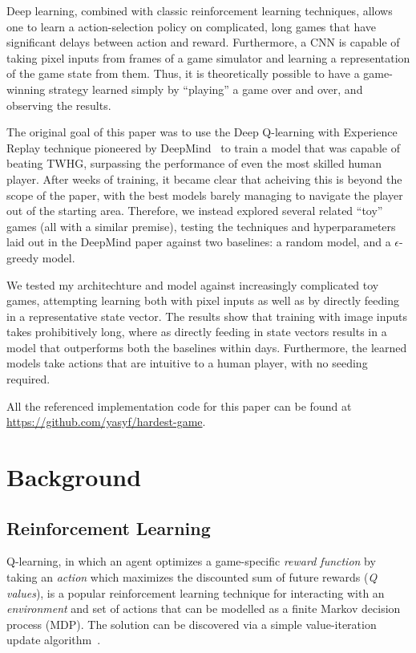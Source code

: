 \documentclass[12pt]{article}
\begin{document}
Deep learning, combined with classic reinforcement learning techniques, allows one to learn a action-selection policy on complicated, long games that have significant delays between action and reward. Furthermore, a CNN is capable of taking pixel inputs from frames of a game simulator and learning a representation of the game state from them. Thus, it is theoretically possible to have a game-winning strategy learned simply by ``playing'' a game over and over, and observing the results.

The original goal of this paper was to use the Deep Q-learning with Experience Replay technique pioneered by DeepMind~\cite{deepmind} to train a model that was capable of beating TWHG, surpassing the performance of even the most skilled human player. After weeks of training, it became clear that acheiving this is beyond the scope of the paper, with the best models barely managing to navigate the player out of the starting area. Therefore, we instead explored several related ``toy'' games (all with a similar premise), testing the techniques and hyperparameters laid out in the DeepMind paper against two baselines: a random model, and a $\epsilon$-greedy model.

We tested my architechture and model against increasingly complicated toy games, attempting learning both with pixel inputs as well as by directly feeding in a representative state vector. The results show that training with image inputs takes prohibitively long, where as directly feeding in state vectors results in a model that outperforms both the baselines within days. Furthermore, the learned models take actions that are intuitive to a human player, with no seeding required.

All the referenced implementation code for this paper can be found at \url{https://github.com/yasyf/hardest-game}.

\section{Background}

\subsection{Reinforcement Learning}

Q-learning, in which an agent optimizes a game-specific \textit{reward function} by taking an \textit{action} which maximizes the discounted sum of future rewards (\textit{Q values}), is a popular reinforcement learning technique for interacting with an \textit{environment} and set of actions that can be modelled as a finite Markov decision process (MDP). The solution can be discovered via a simple value-iteration update algorithm~\cite{Watkins1992}.
\end{document}
